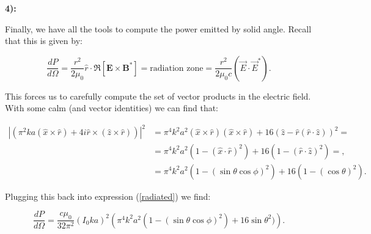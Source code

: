 \textbf{4):}

Finally, we have all the tools to compute the power emitted by solid angle. Recall that this is given by:

\begin{equation}\label{radiated}
	\frac{dP}{d\Omega} = \frac{r^{2}}{2\mu_{0}} \hat{r}\cdot \Re \left[\mathbf{E} \times \mathbf{B}^{*}\right] = \text{radiation zone} = \frac{r^{2}}{2\mu_{0}c} \left(\vec{E}\cdot\vec{E}^{*}\right).
\end{equation}

This forces us to carefully compute the set of vector products in the electric field. With some calm (and vector identities) we can find that:

\begin{equation}
	\begin{split}
		|\left(\pi^{2} k a(\hat{x}\times \hat{r}) + 4i\hat{r}\times(\hat{z}\times \hat{r})\right)|^{2} &=  \pi^{4} k^{2} a^{2}(\hat{x}\times \hat{r})(\hat{x}\times \hat{r}) + 16(\hat{z} - \hat{r}(\hat{r}\cdot \hat{z}))^{2} =\\
		&= \pi^{4} k^{2} a^{2}(1- (\hat{x}\cdot \hat{r})^{2}) + 16(1 - (\hat{r}\cdot \hat{z})^{2}) =,\\
		&= \pi^{4} k^{2} a^{2}(1- (\sin \theta \cos \phi)^{2}) + 16(1 - (\cos \theta)^{2}).
	\end{split}
\end{equation}

Plugging this back into expression (\ref{radiated}) we find:

\begin{equation}
	\frac{dP}{d\Omega} =  \frac{c\mu_{0}}{32 \pi^{2}} (I_{0} k a)^{2}\left(\pi^{4} k^{2} a^{2}(1- (\sin \theta \cos \phi)^{2}) + 16\sin\theta^{2})\right).
\end{equation}


